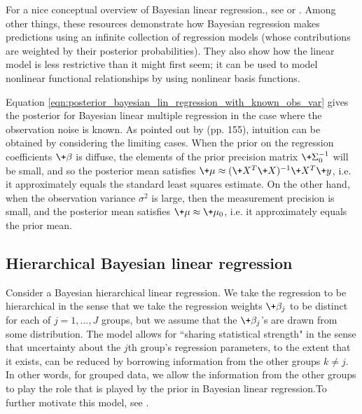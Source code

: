 \documentclass{article} %
\begin{document}
\begin{remark}
For a nice conceptual overview of Bayesian linear regression., see \cite{groseeXXXXbayesian} or \cite{bishop2006pattern}.   Among other things, these resources demonstrate how Bayesian regression makes predictions using an infinite collection of regression models (whose contributions are weighted by their posterior probabilities).  They also show how the linear model is less restrictive than it might first seem;  it can be used to model nonlinear functional relationships by using nonlinear basis functions. 
\end{remark}

\begin{remark}{}
Equation \eqref{eqn:posterior_bayesian_lin_regression_with_known_obs_var}
gives the posterior for Bayesian linear multiple regression in the case where the observation noise is known.    As pointed out by \cite{hoff2009first} (pp. 155),  intuition can be obtained by considering the limiting cases.  When the prior on the regression coefficients $\+\beta$ is diffuse,  the elements of the prior precision matrix $\+\Sigma_0^{-1}$ will be small,  and so the posterior mean satisfies
$\+\mu \approx ( \+X^T \+X)^{-1} \+X^T \+y$,  i.e.  it approximately equals the standard least squares estimate.   On the other hand,   when the observation variance $\sigma^2$ is large,  then the measurement precision is small, and the posterior mean satisfies $\+\mu \approx \+\mu_0$,  i.e.  it approximately equals the prior mean.
\end{remark}

 
\subsection{Hierarchical Bayesian linear regression} \label{sec:hierarchial_linear_regression}

Consider a Bayesian hierarchical linear regression.    We take the regression to be hierarchical in the sense that we take the regression weights $\+\beta_j$ to be distinct for each of $j=1,...,J$ groups,  but we assume that the $\+\beta_j$'s are drawn from some distribution.     The model allows for ``sharing statistical strength" in the sense that uncertainty about the $j$th group's regression parameters,  to the extent that it exists,  can be reduced by borrowing information from the other groups $k \neq j$.    In other words,  for grouped data,  we allow the information from the other groups to play the role that is played by the prior in Bayesian linear regression.To further motivate this model,  see \cite{hoff2009first}.
\end{document}
